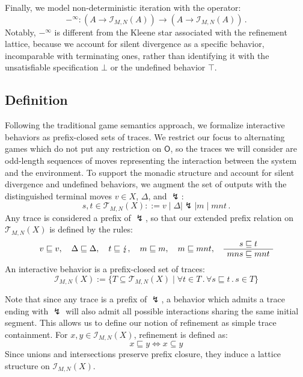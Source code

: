 \documentclass[acmsmall,timestamp,review]{acmart}
\newcommand{\kw}[1]{\ensuremath{ \mathsf{#1} }}
\begin{document}
Finally,
we model non-deterministic iteration with the operator:
\[
     -^\infty : (A \rightarrow \mathcal{I}_{M,N}(A)) \rightarrow
                (A \rightarrow \mathcal{I}_{M,N}(A)) \,.
\]
Notably,
$-^\infty$ is different from
the Kleene star associated with the refinement lattice,
because we account for silent divergence as a specific behavior,
incomparable with terminating ones,
rather than identifying it with
the unsatisfiable specification $\bot$
or the undefined behavior $\top$.


\subsection{Definition} \label{sec:monad:def} %

Following the traditional game semantics approach,
we formalize interactive behaviors as prefix-closed sets of traces.
We restrict our focus to
alternating games which do not put any restriction on $\kw{O}$,
so the traces we will consider are odd-length sequences of moves
representing the interaction between the system and the environment.
To support the monadic structure and account
for silent divergence and undefined behaviors,
we augment the set of outputs with the
distinguished terminal moves $v \in X$, $\Delta$, and $\lightning$:
\[
    s, t \in
    \mathcal{T}_{M,N}(X) ::=
    v \mid \Delta \mid \lightning \mid m \mid mnt \,.
\]
Any trace is considered a prefix of $\lightning$,
so that our extended prefix relation on $\mathcal{T}_{M,N}(X)$
is defined by the rules:
\begin{gather*}
  v \sqsubseteq v , \quad
  \Delta \sqsubseteq \Delta , \quad
  t \sqsubseteq \lightning , \quad
  m \sqsubseteq m , \quad
  m \sqsubseteq mnt ,
  \quad
  \AxiomC{$s \sqsubseteq t$}
  \UnaryInfC{$mns \sqsubseteq mnt$}
  \DisplayProof
\end{gather*}
An interactive behavior is
a prefix-closed set of traces:
\[
    \mathcal{I}_{M,N}(X) :=
    \{ T \subseteq \mathcal{T}_{M,N}(X) \mid
       \forall t \in T \,.\, \forall s \sqsubseteq t \,.\, s \in T \}
\]

Note that since any trace is a prefix of $\lightning$,
a behavior which admits a trace ending with $\lightning$
will also admit all possible interactions
sharing the same initial segment.
This allows us to define our notion of refinement
as simple trace containment.
For $x, y \in \mathcal{I}_{M,N}(X)$, refinement is defined as:
\[
    x \sqsubseteq y \Leftrightarrow x \subseteq y
\]
Since unions and intersections
preserve prefix closure,
they induce a lattice structure on $\mathcal{I}_{M,N}(X)$.
\end{document}
